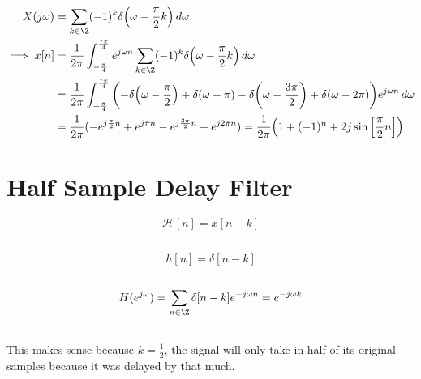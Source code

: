 \documentclass{article}
\begin{document}
\begin{align}
    X(j \omega) &= \sum_{k \in \Z} (-1)^k \delta\qty(\omega - \frac{\pi}{2} k) \, d\omega \\
    \implies x[n] &= \frac{1}{2\pi} \int_{-\frac{\pi}{4}}^{\frac{7\pi}{4}} e^{j \omega n} \sum_{k \in \Z} (-1)^k \delta\qty(\omega - \frac{\pi}{2} k) \, d\omega \\
    &= \frac{1}{2\pi} \int_{-\frac{\pi}{4}}^{\frac{7\pi}{4}} \qty(-\delta\qty(\omega - \frac{\pi}{2}) + \delta(\omega - \pi) - \delta\qty(\omega - \frac{3\pi}{2}) + \delta(\omega - 2\pi)) e^{j \omega n} \, d\omega \\
    &= \frac{1}{2\pi} (-e^{j \frac{\pi}{2} n} + e^{j \pi n} - e^{j \frac{3\pi}{2} n} + e^{j 2\pi n}) = \frac{1}{2\pi} \qty(1 + (-1)^n + 2j \sin\qty[\frac{\pi}{2} n])
\end{align}

\section{Half Sample Delay Filter}

\begin{equation}
    \mathcal{H}[n] = x[n - k]
\end{equation}

\subsection{}

\begin{equation}
    h[n] = \delta[n - k]
\end{equation}

\subsection{}

\begin{align}
    H(e^{j \omega}) = \sum_{n \in \Z} \delta[n - k] e^{-j \omega n} = e^{-j \omega k}
\end{align}

\subsection{}

This makes sense because \(k = \frac{1}{2}\), the signal will only take in half of its original samples because it was delayed by that much.

\subsection{}
\end{document}
